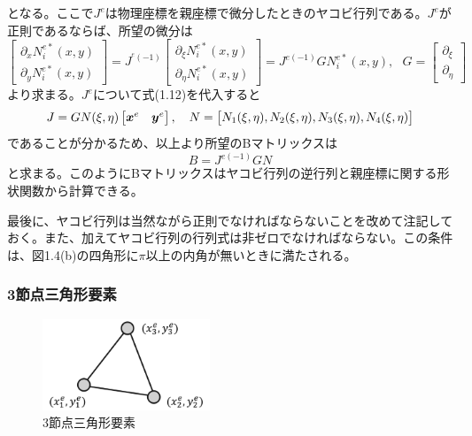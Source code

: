 \documentclass[dvipdfmx, 9pt, a4paper]{jsarticle}
\numberwithin{equation}{section}
\newcommand{\bm}[1]{{\mbox{\boldmath $#1$}}}
\begin{document}
となる。ここで$J^e$は物理座標を親座標で微分したときのヤコビ行列である。$J^e$が正則であるならば、所望の微分は
\begin{equation}
\begin{bmatrix}
\partial_x N^{e*}_i(x, y) \\ \partial_y N^{e*}_i(x, y)
\end{bmatrix}=J^{^e(-1)}
\begin{bmatrix}
\partial_\xi N^{e*}_i(x, y) \\ \partial_\eta N^{e*}_i(x, y)
\end{bmatrix}=J^{e(-1)}GN^{e*}_i(x, y),~~~G=
\begin{bmatrix}
\partial_\xi \\ \partial_\eta
\end{bmatrix}
\end{equation}
より求まる。$J^e$について式(1.12)を代入すると
\begin{equation}
J=GN(\xi, \eta)
\begin{bmatrix}
\bm x^e & \bm y^e
\end{bmatrix},~~~N=\begin{bmatrix}
N_1(\xi, \eta), N_2(\xi, \eta), N_3(\xi, \eta), N_4(\xi, \eta)
\end{bmatrix} \notag
\end{equation}
であることが分かるため、以上より所望のBマトリックスは
\begin{equation}
B=J^{e(-1)}GN
\end{equation}
と求まる。このようにBマトリックスはヤコビ行列の逆行列と親座標に関する形状関数から計算できる。\par
最後に、ヤコビ行列は当然ながら正則でなければならないことを改めて注記しておく。また、加えてヤコビ行列の行列式は非ゼロでなければならない。この条件は、図1.4(b)の四角形に$\pi$以上の内角が無いときに満たされる。

\subsubsection{3節点三角形要素}
\begin{figure}[b]
\begin{center}
\includegraphics[width = 5cm]{fig1_3.png}
\caption{3節点三角形要素}
\end{center}
\end{figure}
\end{document}
